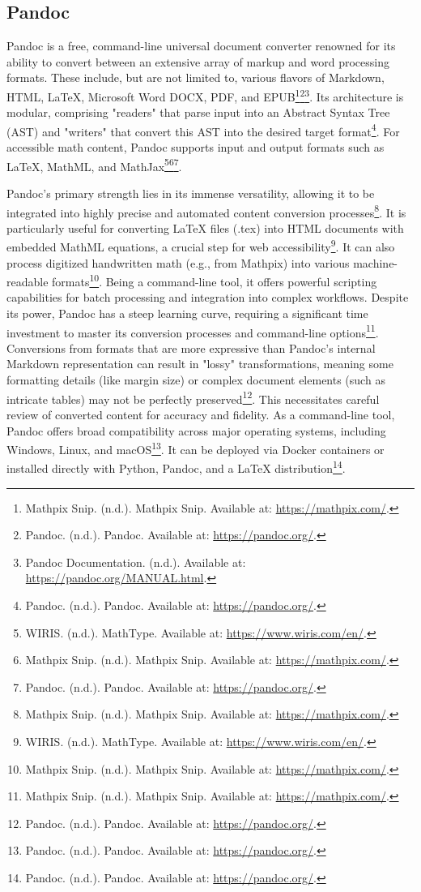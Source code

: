 \subsection{Pandoc}

Pandoc is a free, command-line universal document converter renowned for its ability to convert between an extensive array of markup and word processing formats. These include, but are not limited to, various flavors of Markdown, HTML, LaTeX, Microsoft Word DOCX, PDF, and EPUB\footnote{Mathpix Snip. (n.d.). Mathpix Snip. Available at: \url{https://mathpix.com/}.}\footnote{Pandoc. (n.d.). Pandoc. Available at: \url{https://pandoc.org/}.}\footnote{Pandoc Documentation. (n.d.). Available at: \url{https://pandoc.org/MANUAL.html}.}. Its architecture is modular, comprising "readers" that parse input into an Abstract Syntax Tree (AST) and "writers" that convert this AST into the desired target format\footnote{Pandoc. (n.d.). Pandoc. Available at: \url{https://pandoc.org/}.}. For accessible math content, Pandoc supports input and output formats such as LaTeX, MathML, and MathJax\footnote{WIRIS. (n.d.). MathType. Available at: \url{https://www.wiris.com/en/}.}\footnote{Mathpix Snip. (n.d.). Mathpix Snip. Available at: \url{https://mathpix.com/}.}\footnote{Pandoc. (n.d.). Pandoc. Available at: \url{https://pandoc.org/}.}.

Pandoc's primary strength lies in its immense versatility, allowing it to be integrated into highly precise and automated content conversion processes\footnote{Mathpix Snip. (n.d.). Mathpix Snip. Available at: \url{https://mathpix.com/}.}. It is particularly useful for converting LaTeX files (.tex) into HTML documents with embedded MathML equations, a crucial step for web accessibility\footnote{WIRIS. (n.d.). MathType. Available at: \url{https://www.wiris.com/en/}.}. It can also process digitized handwritten math (e.g., from Mathpix) into various machine-readable formats\footnote{Mathpix Snip. (n.d.). Mathpix Snip. Available at: \url{https://mathpix.com/}.}. Being a command-line tool, it offers powerful scripting capabilities for batch processing and integration into complex workflows. Despite its power, Pandoc has a steep learning curve, requiring a significant time investment to master its conversion processes and command-line options\footnote{Mathpix Snip. (n.d.). Mathpix Snip. Available at: \url{https://mathpix.com/}.}. Conversions from formats that are more expressive than Pandoc's internal Markdown representation can result in "lossy" transformations, meaning some formatting details (like margin size) or complex document elements (such as intricate tables) may not be perfectly preserved\footnote{Pandoc. (n.d.). Pandoc. Available at: \url{https://pandoc.org/}.}. This necessitates careful review of converted content for accuracy and fidelity. As a command-line tool, Pandoc offers broad compatibility across major operating systems, including Windows, Linux, and macOS\footnote{Pandoc. (n.d.). Pandoc. Available at: \url{https://pandoc.org/}.}. It can be deployed via Docker containers or installed directly with Python, Pandoc, and a LaTeX distribution\footnote{Pandoc. (n.d.). Pandoc. Available at: \url{https://pandoc.org/}.}.

